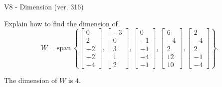 \begin{exercise}
  \begin{exerciseTitle}V8 - Dimension (ver. 316)\end{exerciseTitle}
  \begin{exerciseStatement}
    Explain how to find the dimension of 
\[W=\mathrm{span}\ \left\{\left[\begin{array}{r}
0 \\
2 \\
-2 \\
-2 \\
-4
\end{array}\right] , \left[\begin{array}{r}
-3 \\
0 \\
3 \\
1 \\
2
\end{array}\right] , \left[\begin{array}{r}
0 \\
-1 \\
-1 \\
-4 \\
-1
\end{array}\right] , \left[\begin{array}{r}
6 \\
-4 \\
2 \\
12 \\
10
\end{array}\right] , \left[\begin{array}{r}
2 \\
-4 \\
2 \\
-1 \\
-4
\end{array}\right]\right\}.\]



  \end{exerciseStatement}
  \begin{exerciseAnswer}
   The dimension of \(W\) is  \(4\).
  


  \end{exerciseAnswer}
\end{exercise}